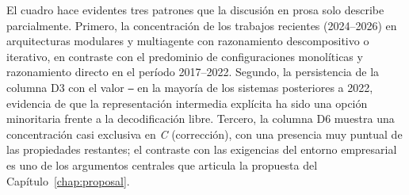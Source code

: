 \renewcommand{\arraystretch}{1.0}

El cuadro hace evidentes tres patrones que la discusión en prosa solo describe parcialmente. Primero, la concentración de los trabajos recientes (2024--2026) en arquitecturas modulares y multiagente con razonamiento descompositivo o iterativo, en contraste con el predominio de configuraciones monolíticas y razonamiento directo en el período 2017--2022. Segundo, la persistencia de la columna D3 con el valor \texttt{---} en la mayoría de los sistemas posteriores a 2022, evidencia de que la representación intermedia explícita ha sido una opción minoritaria frente a la decodificación libre. Tercero, la columna D6 muestra una concentración casi exclusiva en \emph{C} (corrección), con una presencia muy puntual de las propiedades restantes; el contraste con las exigencias del entorno empresarial es uno de los argumentos centrales que articula la propuesta del Capítulo~\ref{chap:proposal}. %
